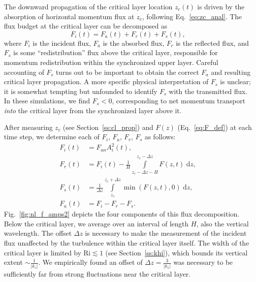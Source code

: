 \documentclass[
        fleqn,
        usenatbib,
    ]{mnras}
\newcommand*{\abs}[1]{\left|#1\right|}
\newcommand*{\ev}[1]{\left\langle#1\right\rangle}
\newcommand*{\z}[1]{\left\{#1\right\}}
\begin{document}
The downward propagation of the critical layer location $z_c(t)$ is driven by
the absorption of horizontal momentum flux at $z_c$, following
Eq.~\eqref{eq:zc_anal}. The flux budget at the critical layer can be decomposed
as
\begin{equation}
    F_i(t) = F_a(t) + F_r(t) + F_s(t),\label{eq:f_budget}
\end{equation}
where $F_i$ is the incident flux, $F_a$ is the absorbed flux, $F_r$ is the
reflected flux, and $F_s$ is some ``redistribution'' flux above the critical
layer, responsible for momentum redistribution within the synchronized upper
layer. Careful accounting of $F_s$ turns out to be important to obtain the
correct $F_a$ and resulting critical layer propagation. A more specific physical
interpretation of $F_s$ is unclear; it is somewhat tempting but unfounded to
identify $F_s$ with the transmitted flux. In these simulations, we find $F_s <
0$, corresponding to net momentum transport \emph{into} the critical layer from
the synchronized layer above it.

After measuring $z_c$ (see Section~\ref{ss:cl_prop}) and $F(z)$
(Eq.~\eqref{eq:F_def}) at each time step, we determine each of $F_i$, $F_a$,
$F_r$, $F_s$ as follows:
\begin{align}
    F_i(t) &= F_{an}A_i^2(t),\\
    F_r(t) &= F_i(t) - \frac{1}{H}
        \int\limits_{z_c - \Delta z - H}^{z_c - \Delta z}F(z, t)\;\mathrm{d}z
        ,\label{eq:fr_def}\\
    F_s(t) &=
        \frac{1}{\Delta z}\int\limits_{z_c}^{z_c + \Delta z}
            \min(F(z, t), 0)\;\mathrm{d}z,
        \label{eq:fs_def}\\
    F_a(t) &= F_i - F_r - F_s.\label{eq:fa_def}
\end{align}
Fig.~\ref{fig:nl_f_amps2} depicts the four components of this flux
decomposition.
Below the critical layer, we average over an interval of length $H$, also the
vertical wavelength. The offset $\Delta z$ is necessary to make the measurement
of the incident flux unaffected by the turbulence within the critical layer
itself. The width of the critical layer is limited by $\mathrm{Ri} \lesssim 1$
(see Section~\ref{ss:khi}), which bounds its vertical extent $\sim
\frac{1}{\abs{k_{z}}}$. We empirically found an offset of $\Delta z =
\frac{3}{\abs{k_z}}$ was necessary to be sufficiently far from strong
fluctuations near the critical layer.
\end{document}
